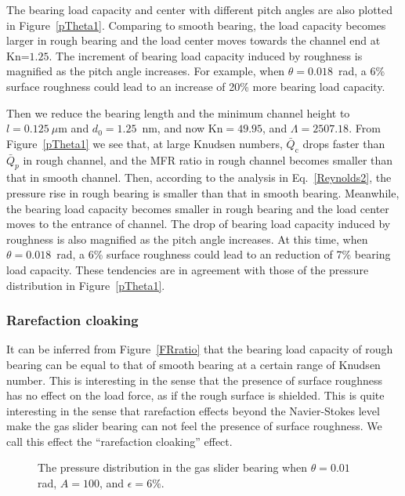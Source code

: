 The bearing load capacity and center with different pitch angles are also plotted in Figure~\ref{pTheta1}. Comparing to smooth bearing, the load capacity becomes larger in rough bearing and the load center moves towards the channel end at $\text{Kn=1.25}$. The increment of bearing load capacity induced by roughness is magnified as the pitch angle increases. For example, when $\theta=0.018$~rad, a 6\% surface roughness could lead to an increase of 20\% more bearing load capacity.


Then we reduce the bearing length and the minimum channel height to $l=0.125\ \mu$m and $d_0=1.25$~nm, and now $\text{Kn}=49.95$, and $\Lambda=2507.18$. From Figure~\ref{pTheta1} we see that,  at large Knudsen numbers, $\bar{Q}_\text{c}$ drops faster than $\bar{Q}_p$ in rough channel, and the MFR ratio in rough channel becomes smaller than that in smooth channel. Then, according to the analysis in Eq.~\eqref{Reynolds2}, the pressure rise in rough bearing is smaller than that in smooth bearing. Meanwhile, the bearing load capacity becomes smaller in rough bearing and the load center moves to the entrance of channel. The drop of bearing load capacity induced by roughness is also magnified as the pitch angle increases. At this time, when $\theta=0.018$~rad, a 6\% surface roughness could lead to an reduction of 7\% bearing load capacity. These tendencies are in agreement with those of the pressure distribution in Figure~\ref{pTheta1}.



\subsubsection{Rarefaction cloaking}
It can be inferred from Figure~\ref{FRratio} that the bearing load capacity of rough bearing can be equal to that of smooth bearing at a certain range of Knudsen number. This is interesting in the sense that the presence of surface roughness has no effect on the load force, as if the rough surface is shielded. This is quite interesting in the sense that rarefaction effects beyond the Navier-Stokes level make the gas slider bearing can not feel the presence of surface roughness.  We call this effect the ``rarefaction cloaking'' effect.





\begin{figure}[t]
	\centering
	\hskip 0.5cm
	\caption{The pressure distribution in the gas slider bearing when $\theta=0.01$ rad, $A=100$, and $\epsilon=6\%$.}
	\label{pLamdba1}
\end{figure}





